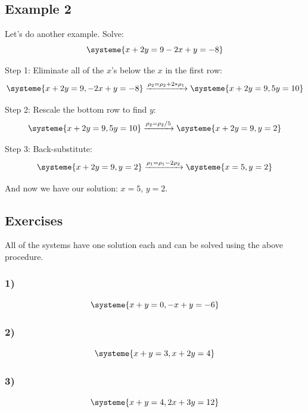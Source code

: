 \documentclass[a4paper,twoside,12pt]{memoir}  %
\begin{document}
\subsection{Example 2}
Let's do another example.
Solve: %
\begin{equation*}
  \systeme{
    x + 2y = 9
  -2x +  y = -8
  }
\end{equation*}

Step 1: Eliminate all of the $x$'s below the $x$ in the first row:
\begin{equation*}
  \systeme{
    x + 2y = 9,
  -2x +  y = -8
  }
  \xrightarrow{\rho_2 = \rho_2 + 2*\rho_1}
  \systeme{
    x + 2y = 9,
        5y = 10
  }
\end{equation*}

Step 2: Rescale the bottom row to find $y$:
\begin{equation*}
  \systeme{
    x + 2y = 9,
        5y = 10
  }
  \xrightarrow{\rho_2 = \rho_2/5}
  \systeme{
    x + 2y = 9,
         y = 2
  }
\end{equation*}

Step 3: Back-substitute:
\begin{equation*}
  \systeme{
    x + 2y = 9,
         y = 2
  }
  \xrightarrow{\rho_1 = \rho_1 - 2\rho_2}
  \systeme{
    x      = 5,
         y = 2
  }
\end{equation*}

And now we have our solution: $x=5$, $y=2$.

\subsection{Exercises}
All of the systems have one solution each and can be solved using the above procedure.
\subsubsection{1)}
\begin{equation*} %
  \systeme{
    x + y = 0,
   -x + y = -6
  }
\end{equation*}

\subsubsection{2)}
\begin{equation*} %
  \systeme{
    x +  y = 3,
    x + 2y = 4
  }
\end{equation*}

\subsubsection{3)}
\begin{equation*} %
  \systeme{
     x +  y = 4,
    2x + 3y = 12
  }
\end{equation*}
\end{document}
